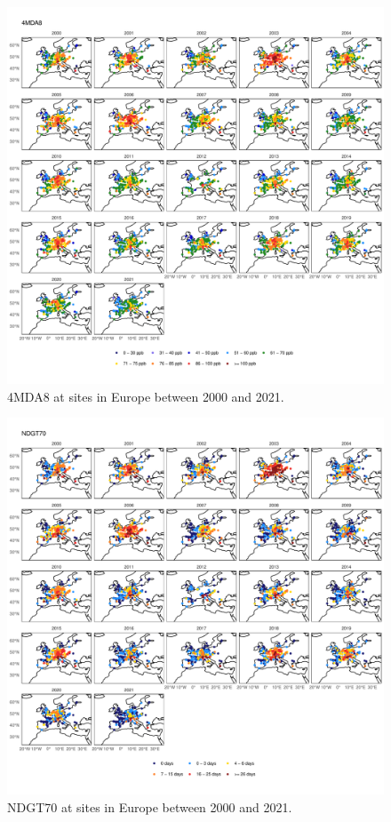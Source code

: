 \documentclass{article}
\begin{document}
\begin{figure}
\centering
\includegraphics[height=0.9\textheight]{figures/si_figures/fS10_metric_map_Europe_4MDA8.pdf}
\caption{4MDA8 at sites in Europe between 2000 and 2021.}
\label{si_fig:metric_map_eu_4MDA8}
\end{figure}
\clearpage

\begin{figure}
\centering
\includegraphics[height=0.9\textheight]{figures/si_figures/fS11_metric_map_Europe_NDGT70.pdf}
\caption{NDGT70 at sites in Europe between 2000 and 2021.}
\label{si_fig:metric_map_eu_NDGT70}
\end{figure}
\clearpage
\end{document}
